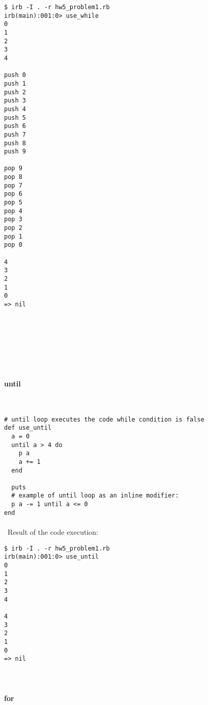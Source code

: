 \documentclass{article}
\begin{document}
\begin{verbatim} 
$ irb -I . -r hw5_problem1.rb
irb(main):001:0> use_while
0
1
2
3
4

push 0
push 1
push 2
push 3
push 4
push 5
push 6
push 7
push 8
push 9

pop 9
pop 8
pop 7
pop 6
pop 5
pop 4
pop 3
pop 2
pop 1
pop 0

4
3
2
1
0
=> nil
\end{verbatim}

\paragraph{}\
\paragraph{}\
\paragraph{}\

\paragraph{ until}\

\begin{verbatim}
# until loop executes the code while condition is false
def use_until
  a = 0
  until a > 4 do
    p a
    a += 1
  end

  puts
  # example of until loop as an inline modifier:
  p a -= 1 until a <= 0
end
\end{verbatim}

\paragraph{}\
Result of the code execution:

\begin{verbatim} 
$ irb -I . -r hw5_problem1.rb
irb(main):001:0> use_until
0
1
2
3
4

4
3
2
1
0
=> nil
\end{verbatim}


\paragraph{}\


\paragraph{ for}\
\end{document}
